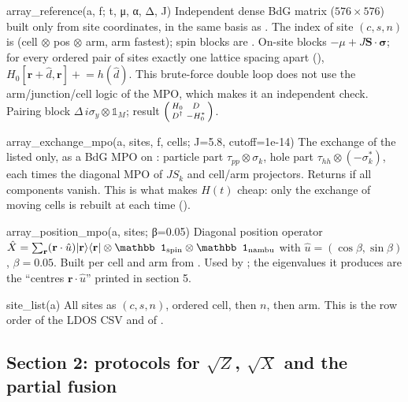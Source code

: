 \begin{function}{array\_reference(a, f; t, μ, α, Δ, J)}
Independent dense BdG matrix ($576\times576$) built only from site coordinates, in the same basis as . The index of
site $(c,s,n)$ is  (cell $\otimes$ pos $\otimes$ arm, arm fastest); spin blocks are \code{[i, M+i]}. On-site blocks
$-\mu + J\mathbf S\cdot\boldsymbol\sigma$; for every ordered pair of sites exactly one lattice spacing apart (),
$H_0[\mathbf r+\hat d,\mathbf r] \mathrel{+}= h(\hat d)$. This brute-force double loop does not use the arm/junction/cell logic of the MPO,
which makes it an independent check. Pairing block $\Delta\,i\sigma_y\otimes\mathbb1_M$; result $\begin{psmallmatrix}H_0 & D\\ D^\dagger & -H_0^*\end{psmallmatrix}$.
\end{function}

\begin{function}{array\_exchange\_mpo(a, sites, f, cells; J=5.8, cutoff=1e-14)}
The exchange of the listed  only, as a BdG MPO on : particle part $\tau_{pp}\otimes\sigma_k$, hole part
$\tau_{hh}\otimes(-\sigma_k^*)$, each times the diagonal MPO of $JS_k$ and cell/arm projectors. Returns  if all components
vanish. This is what makes $H(t)$ cheap: only the exchange of moving cells is rebuilt at each time ().
\end{function}

\begin{function}{array\_position\_mpo(a, sites; β=0.05)}
Diagonal position operator $\hat X = \sum_{\mathbf r} (\mathbf r\cdot\hat u)\ket{\mathbf r}\bra{\mathbf r}\otimes\mathbb1_{\rm spin}\otimes\mathbb1_{\rm nambu}$
with $\hat u = (\cos\beta, \sin\beta)$, $\beta = 0.05$. Built per cell and arm from . Used by ;
the eigenvalues it produces are the ``centres $\mathbf r\cdot\hat u$'' printed in section 5.
\end{function}

\begin{function}{site\_list(a)}
All sites as $(c, s, n)$, ordered cell, then $n$, then arm. This is the row order of the LDOS CSV and of .
\end{function}

\subsection{Section 2: protocols for \texorpdfstring{$\sqrt Z$, $\sqrt X$}{√Z, √X} and the partial fusion}

